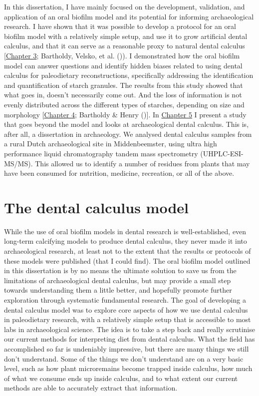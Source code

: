 \documentclass[
  b5paper,
]{book}
\begin{document}
In this dissertation, I have mainly focused on the development,
validation, and application of an oral biofilm model and its potential
for informing archaeological research. I have shown that it was possible
to develop a protocol for an oral biofilm model with a relatively simple
setup, and use it to grow artificial dental calculus, and that it can
serve as a reasonable proxy to natural dental calculus
{[}\hyperref[byoc-valid]{Chapter 3}; Bartholdy, Velsko, et al.
()). I demonstrated
how the oral biofilm model can answer questions and identify hidden
biases related to using dental calculus for paleodietary
reconstructions, specifically addressing the identification and
quantification of starch granules. The results from this study showed
that what goes in, doesn't necessarily come out. And the loss of
information is not evenly distributed across the different types of
starches, depending on size and morphology
{[}\hyperref[byoc-starch]{Chapter 4}; Bartholdy \& Henry
(){]}. In
\hyperref[mb11CalculusPilot]{Chapter 5} I present a study that goes
beyond the model and looks at archaeological dental calculus. This is,
after all, a dissertation in archaeology. We analysed dental calculus
samples from a rural Dutch archaeological site in Middenbeemster, using
ultra high performance liquid chromatography tandem mass spectrometry
(UHPLC-ESI-MS/MS). This allowed us to identify a number of residues from
plants that may have been consumed for nutrition, medicine, recreation,
or all of the above.

\section{The dental calculus model}\label{the-dental-calculus-model}

While the use of oral biofilm models in dental research is
well-established, even long-term calcifying models to produce dental
calculus, they never made it into archaeological research, at least not
to the extent that the results or protocols of these models were
published (that I could find). The oral biofilm model outlined in this
dissertation is by no means the ultimate solution to save us from the
limitations of archaeological dental calculus, but may provide a small
step towards understanding them a little better, and hopefully promote
further exploration through systematic fundamental research. The goal of
developing a dental calculus model was to explore core aspects of how we
use dental calculus in paleodietary research, with a relatively simple
setup that is accessible to most labs in archaeological science. The
idea is to take a step back and really scrutinise our current methods
for interpreting diet from dental calculus. What the field has
accomplished so far is undeniably impressive, but there are many things
we still don't understand. Some of the things we don't understand are on
a very basic level, such as how plant microremains become trapped inside
calculus, how much of what we consume ends up inside calculus, and to
what extent our current methods are able to accurately extract that
information.
\end{document}
